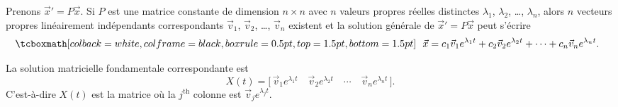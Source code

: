 \begin{theorem}
Prenons ${\vec{x}}' = P\vec{x}$. Si $P$ est une matrice constante de dimension $n \times n$ avec $n$ valeurs propres réelles distinctes $\lambda_1$, $\lambda_2$, \ldots, $\lambda_n$,
alors $n$ vecteurs propres linéairement indépendants correspondants
$\vec{v}_1$, $\vec{v}_2$, \ldots, $\vec{v}_n$ existent et la solution générale de
${\vec{x}}' = P\vec{x}$
peut s’écrire
\begin{equation*}
\mybxbg{~~
\vec{x} = c_1 \vec{v}_1 e^{\lambda_1 t} +
c_2 \vec{v}_2 e^{\lambda_2 t} + \cdots +
c_n \vec{v}_n e^{\lambda_n t} .
~~}
\end{equation*}
\end{theorem}

La solution matricielle fondamentale correspondante est
\begin{equation*}
X(t) = \bigl[\, \vec{v}_1 e^{\lambda_1 t} \quad \vec{v}_2 e^{\lambda_2 t}
\quad \cdots \quad \vec{v}_n e^{\lambda_n t} \,\bigr].
\end{equation*}
C’est-à-dire $X(t)$
est la matrice où la $j^{\text{th}}$ colonne est
$\vec{v}_j e^{\lambda_j t}$.

